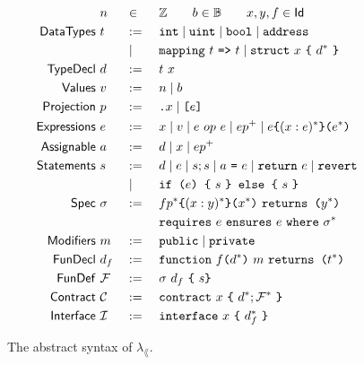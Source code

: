 \newcommand{\AddrCall}[3]{
  {#1}\Keywd{\{}{#2}\Keywd{\}(}{#3}\Keywd{)}
}
\newcommand{\Call}[2]{
  {#1}\Keywd{(}{#2}\Keywd{)}
}
\newcommand{\SpecCall}[4]{
  {#1}\Keywd{\{}{#2}\Keywd{\}(}{#3}\Keywd{)} ~\Keywd{returns (}{#4}\Keywd{)}
}
\newcommand{\SpecCond}[3]{
  \Keywd{requires}~ {#1} ~\Keywd{ensures}~ {#2} ~\Keywd{where}~ {#3}
}
\newcommand{\FunDef}[6]{
  {#1} ~\Keywd{function}~ {#2}\Keywd{(}{#3}\Keywd{)} ~ {#4} ~\Keywd{returns (}{#5}\Keywd{)} ~\Keywd{\{}~ {#6} ~\Keywd{\}}
}
\newcommand{\FunType}[4]{
  \Keywd{function}~ {#1}\Keywd{(}{#2}\Keywd{)} ~ {#3} ~\Keywd{returns (}{#4}\Keywd{)}
}
\newcommand{\Contract}[3]{
  \Keywd{contract}~ {#1}~ \Keywd{\{}~ {#2}; {#3} ~\Keywd{\}}
}
\newcommand{\Interface}[2]{
  \Keywd{interface}~ {#1}~ \Keywd{\{}~ {#2} ~\Keywd{\}}
}

\newcommand{\F}{\mathcal{F}}
\newcommand{\C}{\mathcal{C}}
\newcommand{\I}{\mathcal{I}}

\begin{figure}
  \begin{alignat*}{3}
    &~ n && \in && \mathbb{Z} \qquad b \in \mathbb{B} \qquad x,y,f \in \Typ{Id}   \\
    \Typ{Data Types} &~ t && :=\ && \Keywd{int} \mid \Keywd{uint} \mid \Keywd{bool} \mid \Keywd{address} \\
                &~   && \mid\ && \Keywd{mapping} ~t~ \Keywd{=>} ~t \mid \Keywd{struct} ~x~ \Keywd{\{}~ d^* ~\Keywd{\}} \\
    \Typ{Type Decl}    &~ d && :=\ && t ~ x \\
    \Typ{Values}      &~ v && :=\ && n \mid b \\
    \Typ{Projection}  &~ p && :=\ && \Keywd{.}x \mid \Keywd{[}e\Keywd{]} \\
    \Typ{Expressions} &~ e && :=\ && x \mid v \mid e ~op~ e \mid e p^+ \mid \AddrCall{e}{(x: e)^*}{e^*} \\
    \Typ{Assignable}  &~ a && :=\ && d \mid x \mid e p^+ \\
    \Typ{Statements}  &~ s && :=\ && d \mid e \mid s; s \mid a ~\Keywd{=}~ e \mid \Keywd{return}~ e \mid \Keywd{revert} \\
                      &~   && \mid\ && \Keywd{if (}e\Keywd{) \{}~ s ~\Keywd{\} else \{}~ s ~\Keywd{\}} \\
    \Typ{Spec}        &~ \sigma && :=\ && \SpecCall{fp^*}{(x : y)^*}{x^*}{y^*} \\
                      &~        &&     && \SpecCond{e}{e}{\sigma^*} \\
    \Typ{Modifiers}   &~ m && :=\ && \Keywd{public} \mid \Keywd{private} \\
    \Typ{Fun Decl}    &~ d_f && :=\ && \FunType{f}{d^*}{m}{t^*} \\
    \Typ{Fun Def}     &~ \F&& :=\ && \sigma ~ d_f ~ \Keywd{\{} ~ s \Keywd{\}} \\
    \Typ{Contract}    &~ \C&& :=\ && \Contract{x}{d^*}{\F^*} \\
    \Typ{Interface}   &~ \I&& :=\ && \Interface{x}{d_f^*}
  \end{alignat*}
  \caption{The abstract syntax of $\lambda_\lang$.}
  \label{fig:syntax}
\end{figure}

